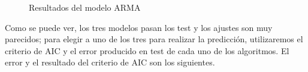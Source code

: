 \begin{figure}[H]
	\centering
	\caption{Resultados del modelo ARMA}
	\label{fig:13}
\end{figure}

Como se puede ver, los tres modelos pasan los test y los ajustes son muy parecidos; para elegir a uno de los tres para realizar la predicción, utilizaremos el criterio de AIC y el error producido en test de cada uno de los algoritmos. El error y el resultado del criterio de AIC son los siguientes.

